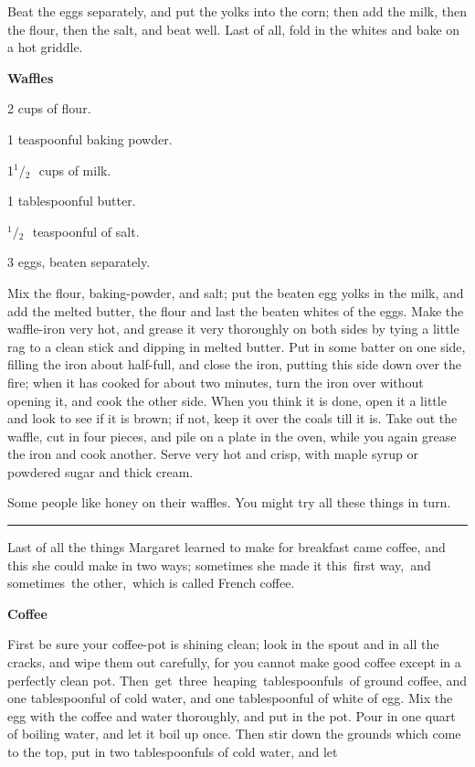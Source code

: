 \documentclass[11pt]{book}
\newcommand{\hstroke}{\rule[0.5ex]{5.0em}{0.2ex}}
\newcommand{\indpar}{\par\noindent\hspace*{\parindent}}
\newcommand{\ingredient}{\indpar}
\newcommand{\instruction}{\indpar}
\newcommand{\OneHalf}{\ensuremath{{}^1\!\!/\!{}_2\mbox{\ }}}
\newenvironment{RecipeTitle}{\medskip\begin{center}\large\bf }{\end{center}\smallskip}
\begin{document}
\instruction
  Beat the eggs separately, and put the yolks into the corn;
then add the milk, then the flour, then the salt, and beat well.
Last of all, fold in the whites and bake on a hot griddle.
\begin{RecipeTitle}
Waffles\label{waffles}
\end{RecipeTitle}
\ingredient  2 cups of flour.
\ingredient  1 teaspoonful baking powder.
\ingredient  1\OneHalf cups of milk.
\ingredient  1 tablespoonful butter.
\ingredient  \OneHalf teaspoonful of salt.
\ingredient  3 eggs, beaten separately.
\instruction
  Mix the flour, baking-powder, and salt; put the beaten egg yolks
in the milk, and add the melted butter, the flour and last the
beaten whites of the eggs.  Make the waffle-iron very hot, and
grease it very thoroughly on both sides by tying a little rag
to a clean stick and dipping in melted butter.  Put in some
batter on one side, filling the iron about half-full, and close
the iron, putting this side down over the fire; when it has cooked
for about two minutes, turn the iron over without opening it,
and cook the other side.  When you think it is done, open it a
little and look to see if it is brown; if not, keep it over the
coals till it is.  Take out the waffle, cut in four pieces, and
pile on a plate in the oven, while you again grease the iron
and cook another.  Serve very hot and crisp, with maple syrup
or powdered sugar and thick cream.
\instruction
  Some people like honey on their waffles.  You might try all
these things in turn.
\bigskip
\begin{center}
\hstroke
\end{center}
\medskip
\indpar
  Last of all the things Margaret learned to make for breakfast
came coffee, and this she could make in two ways; sometimes she
made it this\, first way,\, and sometimes\, the other,\, which is called
French coffee.
\begin{RecipeTitle}
Coffee\label{coffee}
\end{RecipeTitle}
\instruction
  First be sure your coffee-pot is shining clean; look in the
spout and in all the cracks, and wipe them out carefully, for
you cannot make good coffee except in a perfectly clean pot.
Then\, get\, three\, heaping\, tablespoonfuls\, of ground coffee, and
one tablespoonful of cold water, and one tablespoonful of
white of egg.  Mix the egg with the coffee and water thoroughly,
and put in the pot.  Pour in one quart of boiling water, and
let it boil up once.  Then stir down the grounds which come
to the top, put in two tablespoonfuls of cold water, and let
\end{document}
